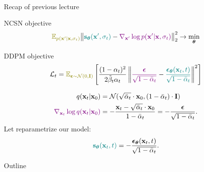 

\usepackage{tikz}

\usetikzlibrary{arrows,shapes,positioning,shadows,trees}

\begin{frame}
\titlepage
\end{frame}
\begin{frame}{Recap of previous lecture}
	\begin{block}{NCSN objective}
		\vspace{-0.2cm}
		\[
			{\color{olive}\bbE_{p(\bx' | \bx, \sigma_t)}}\bigl\| {\color{teal}\bs_{\btheta}(\bx', \sigma_t)} - {\color{violet}\nabla_{\bx'} \log p(\bx' | \bx, \sigma_t)} \bigr\|^2_2 \rightarrow \min_{\btheta}
		\]
	\end{block}
	\vspace{-0.3cm}
	\begin{block}{DDPM objective}
		\vspace{-0.2cm}
		\[
			\cL_t = {\color{olive}\bbE_{\bepsilon \sim \cN(0, \bI)}} \left[ \frac{(1 - \alpha_t)^2}{2\tilde{\beta}_t \alpha_t} \left\| {\color{violet}\frac{\bepsilon}{\sqrt{1 - \bar{\alpha}_t}}} - {\color{teal}\frac{\bepsilon_{\btheta}(\bx_t, t)}{\sqrt{1 - \bar{\alpha}_t}}}\right\|^2 \right]
		\]
		\vspace{-0.7cm}
	\end{block}
	\begin{align*}
		q(\mathbf{x}_t | \mathbf{x}_0) &= \mathcal{N}(\sqrt{\bar{\alpha}_t} \cdot \mathbf{x}_0, (1 - \bar{\alpha}_t) \cdot \mathbf{I}) \\
		{\color{violet}\nabla_{\mathbf{x}_t} \log q(\mathbf{x}_t | \mathbf{x}_0)} &= - \frac{\mathbf{x}_t - \sqrt{\bar{\alpha}_t} \cdot \mathbf{x}_0}{1 - \bar{\alpha}_t} = - \frac{\boldsymbol{\epsilon}}{\sqrt{1 - \bar{\alpha}_t}}.
	\end{align*}
		Let reparametrize our model: 
		\vspace{-0.2cm}
		\[
			{\color{teal}\mathbf{s}_{\boldsymbol{\theta}}(\mathbf{x}_t, t)} = - \frac{\boldsymbol{\epsilon}_{\boldsymbol{\theta}}(\mathbf{x}_t, t)}{\sqrt{1 - \bar{\alpha}_t}}.
		\]
	\end{frame}
\begin{frame}{Outline}
	\tableofcontents
\end{frame}
